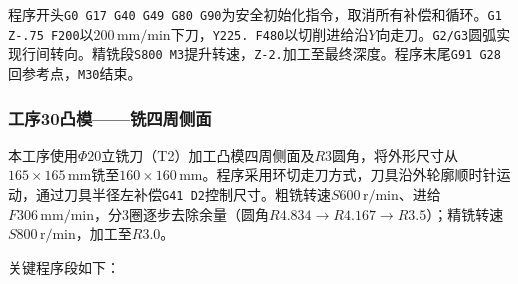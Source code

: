 \documentclass{xautCADreport}
\begin{document}
程序开头\texttt{G0 G17 G40 G49 G80 G90}为安全初始化指令，取消所有补偿和循环。\texttt{G1 Z-.75 F200}以$200\,\mathrm{mm/min}$下刀，\texttt{Y225. F480}以切削进给沿$Y$向走刀。\texttt{G2/G3}圆弧实现行间转向。精铣段\texttt{S800 M3}提升转速，\texttt{Z-2.}加工至最终深度。程序末尾\texttt{G91 G28}回参考点，\texttt{M30}结束。

\subsubsection{工序30凸模——铣四周侧面}

本工序使用$\Phi20$立铣刀（T2）加工凸模四周侧面及$R3$圆角，将外形尺寸从$165\times165\,\mathrm{mm}$铣至$160\times160\,\mathrm{mm}$。程序采用环切走刀方式，刀具沿外轮廓顺时针运动，通过刀具半径左补偿\texttt{G41 D2}控制尺寸。粗铣转速$S600\,\mathrm{r/min}$、进给$F306\,\mathrm{mm/min}$，分3圈逐步去除余量（圆角$R4.834\to R4.167\to R3.5$）；精铣转速$S800\,\mathrm{r/min}$，加工至$R3.0$。

关键程序段如下：
\end{document}
